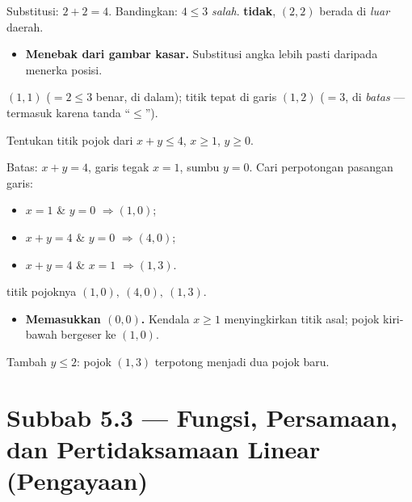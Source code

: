 \jawab
{} Substitusi: $2+2=4$.
 Bandingkan: $4\le3$ \emph{salah}.
\jadi \textbf{tidak}, $(2,2)$ berada di \emph{luar} daerah.

\begin{jebakan}
\begin{itemize}[leftmargin=*,topsep=2pt]
  \item \textbf{Menebak dari gambar kasar.} Substitusi angka lebih pasti daripada
  menerka posisi.
\end{itemize}
\end{jebakan}

\begin{variasi}
$(1,1)$ ($=2\le3$ benar, di dalam); titik tepat di garis $(1,2)$ ($=3$, di
\emph{batas} --- termasuk karena tanda ``$\le$'').
\end{variasi}

\begin{soalbox}{}
Tentukan titik pojok dari $x+y\le4$, $x\ge1$, $y\ge0$.
\end{soalbox}

\jawab
{} Batas: $x+y=4$, garis tegak $x=1$, sumbu $y=0$.
 Cari perpotongan pasangan garis:
\begin{itemize}[leftmargin=*,topsep=1pt]
  \item $x=1$ \& $y=0$ $\Rightarrow (1,0)$;
  \item $x+y=4$ \& $y=0$ $\Rightarrow (4,0)$;
  \item $x+y=4$ \& $x=1$ $\Rightarrow (1,3)$.
\end{itemize}
\jadi titik pojoknya $(1,0),\ (4,0),\ (1,3)$.

\begin{jebakan}
\begin{itemize}[leftmargin=*,topsep=2pt]
  \item \textbf{Memasukkan $(0,0)$.} Kendala $x\ge1$ menyingkirkan titik asal;
  pojok kiri-bawah bergeser ke $(1,0)$.
\end{itemize}
\end{jebakan}

\begin{variasi}
Tambah $y\le2$: pojok $(1,3)$ terpotong menjadi dua pojok baru.
\end{variasi}

\section*{Subbab 5.3 — Fungsi, Persamaan, dan Pertidaksamaan Linear (Pengayaan)}

